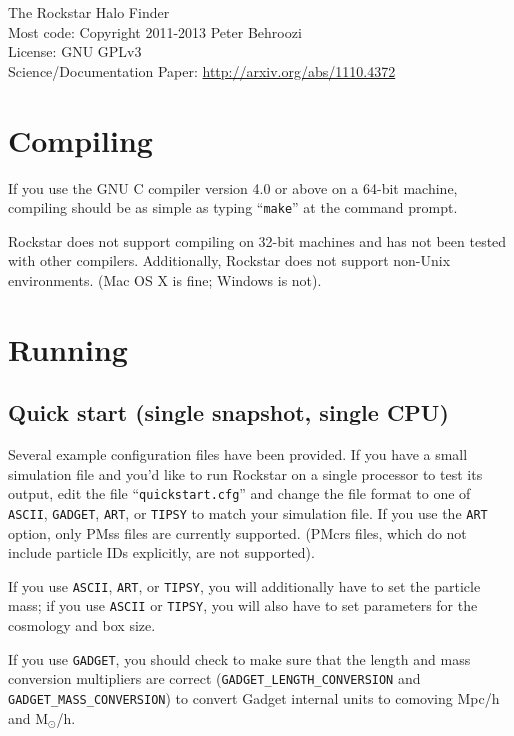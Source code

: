 \documentclass[12pt]{article}
\begin{document}
\vspace{-1ex}
\noindent{}The Rockstar Halo Finder\\
\noindent{}Most code: Copyright \textcopyright{}2011-2013 Peter Behroozi\\
\noindent{}License: GNU GPLv3\\
\noindent{}Science/Documentation Paper: \url{http://arxiv.org/abs/1110.4372}\\

\tableofcontents
\newcommand{\ttt}[1]{\texttt{#1}}

\section{Compiling}
   If you use the GNU C compiler version 4.0 or above on a 64-bit machine,
   compiling should be as simple as typing ``\texttt{make}'' at the command prompt.

   Rockstar does not support compiling on 32-bit machines and has not been
   tested with other compilers.  Additionally, Rockstar does not support
   non-Unix environments.  (Mac OS X is fine; Windows is not).

\section{Running}
   \subsection{Quick start (single snapshot, single CPU)}
      Several example configuration files have been provided.  If you have a
      small simulation file and you'd like to run Rockstar on a single processor
      to test its output, edit the file ``\texttt{quickstart.cfg}'' and change the file
      format to one of \texttt{ASCII}, \texttt{GADGET}, \texttt{ART}, or \texttt{TIPSY} to match your
      simulation file.  If you use the \texttt{ART} option, only PMss files are
      currently supported.  (PMcrs files, which do not include particle IDs
      explicitly, are not supported).

      If you use \texttt{ASCII}, \ttt{ART}, or \ttt{TIPSY}, you will additionally have to set
      the particle mass; if you use \ttt{ASCII} or \ttt{TIPSY}, you will also have to
      set parameters for the cosmology and box size.

      If you use \texttt{GADGET}, you should check to make sure that the length
      and mass conversion multipliers are correct (\ttt{GADGET\_LENGTH\_CONVERSION} and
      \ttt{GADGET\_MASS\_CONVERSION}) to convert Gadget internal units to comoving Mpc/h
      and M$_\odot$/h.
\end{document}
